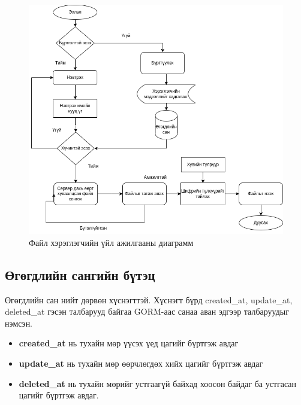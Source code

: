 \begin{figure}[H]
    \centering
    \includegraphics[scale=0.4]{Figures/system_schemes/delegatee.drawio.png}
    \caption{Файл хэрэглэгчийн үйл ажилгааны диаграмм}
    \label{fig:delegatee_diagram}
\end{figure}


\subsection*{Өгөгдлийн сангийн бүтэц}
Өгөгдлийн сан нийт дөрвөн хүснэгттэй. Хүснэгт бүрд created\_at, update\_at, deleted\_at гэсэн талбарууд байгаа GORM-аас санаа аван эдгээр талбаруудыг нэмсэн.

\begin{itemize}
    \item \textbf{created\_at} нь тухайн мөр үүсэх үед цагийг бүртгэж авдаг
    \item \textbf{update\_at} нь тухайн мөр өөрчлөгдөх хийх цагийг бүртгэж авдаг
    \item \textbf{deleted\_at} нь тухайн мөрийг устгаагүй байхад хоосон байдаг ба устгасан цагийг бүртгэж авдаг.
\end{itemize}

